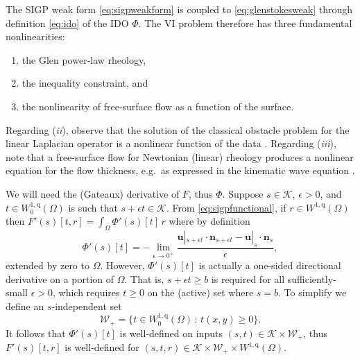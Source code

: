 \documentclass[letterpaper,final,12pt,reqno]{amsart}
\theoremstyle{claim}
\newcommand{\eps}{\epsilon}
\newcommand{\bn}{\mathbf{n}}
\newcommand{\bu}{\mathbf{u}}
\newcommand{\qq}{{\text{q}}}
\newcommand{\bus}{\bu|_s}
\numberwithin{equation}{section}
\numberwithin{figure}{section}
\numberwithin{table}{section}
\numberwithin{theorem}{section}
\begin{document}
The SIGP weak form \eqref{eq:sigpweakform} is coupled to \eqref{eq:glenstokesweak} through definition \eqref{eq:ido} of the IDO $\Phi$.  The VI problem therefore has three fundamental nonlinearities:
\renewcommand{\labelenumi}{(\emph{\roman{enumi}})}
\begin{enumerate}
\item the Glen power-law rheology,
\item the inequality constraint, and
\item the nonlinearity of free-surface flow as a function of the surface.
\end{enumerate}
Regarding (\emph{ii}), observe that the solution of the classical obstacle problem for the linear Laplacian operator is a nonlinear function of the data \cite{KinderlehrerStampacchia1980}.  Regarding (\emph{iii}), note that a free-surface flow for Newtonian (linear) rheology produces a nonlinear equation for the flow thickness, e.g.~as expressed in the kinematic wave equation \cite{Ockendonetal2003}.

We will need the (Gateaux) derivative of $F$, thus $\Phi$.  Suppose $s\in \mathcal{K}$, $\eps>0$, and $t \in W_0^{1,\qq}(\Omega)$ is such that $s+\eps t \in \mathcal{K}$.  From \eqref{eq:sigpfunctional}, if $r\in W^{1,\qq}(\Omega)$ then $F'(s)[t,r] = \int_\Omega \Phi'(s)[t]\, r$ where by definition
\begin{equation}
\Phi'(s)[t] = - \lim_{\eps\to 0^+} \frac{\bu|_{s+\eps t} \cdot \bn_{s+\eps t} - \bus \cdot \bn_s}{\eps}, \label{eq:idoderiv}
\end{equation}
extended by zero to $\Omega$.  However, $\Phi'(s)[t]$ is actually a one-sided directional derivative on a portion of $\Omega$.  That is, $s+\eps t\ge b$ is required for all sufficiently-small $\eps>0$, which requires $t\ge 0$ on the (active) set where $s=b$.  To simplify we define an $s$-independent set
\begin{equation}
\mathcal{W}_+ = \{t \in W_0^{1,\qq}(\Omega) \,:\, t(x,y) \ge 0\}. \label{eq:infdefectset}
\end{equation}
It follows that $\Phi'(s)[t]$ is well-defined on inputs $(s,t) \in \mathcal{K} \times \mathcal{W}_+$, thus $F'(s)[t,r]$ is well-defined for $(s,t,r) \in \mathcal{K} \times \mathcal{W}_+ \times W^{1,\qq}(\Omega)$.
\end{document}
